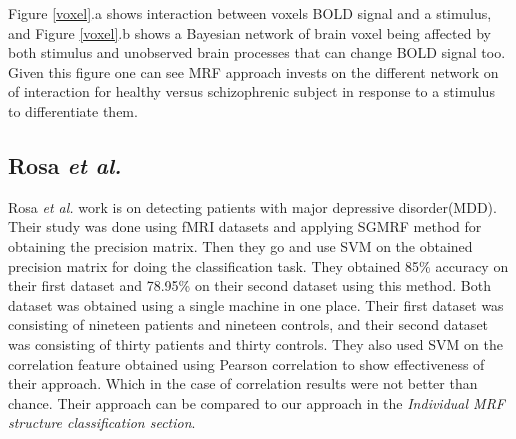 \documentclass{article} %
\begin{document}
Figure \ref{voxel}.a shows interaction between voxels BOLD signal and a 
stimulus, and Figure \ref{voxel}.b shows a Bayesian network of brain voxel 
being affected by both stimulus and unobserved brain processes that can 
change BOLD signal too. Given this figure one can see MRF approach invests 
on the different network on of interaction for healthy versus schizophrenic 
subject in response to a stimulus to differentiate them. 

\subsection{Rosa \emph{et al.}}
Rosa \emph{et al.} \cite{Rosa_2013} work is on detecting patients with major depressive disorder(MDD). Their study was done using fMRI datasets and applying SGMRF method for obtaining the precision matrix. Then they go and use SVM on the obtained precision matrix for doing the classification task. They obtained 85\% accuracy on their first dataset and 78.95\% on their second dataset using this method. Both dataset was obtained using a single machine in one place. Their first dataset was consisting of nineteen patients and nineteen controls, and their second dataset was consisting of thirty patients and thirty controls. They also used SVM on the correlation feature obtained using Pearson correlation to show effectiveness of their approach. Which in the case of correlation results were not better than chance. Their approach can be compared to our approach in the \textit{Individual MRF structure classification section}.       
\end{document}
